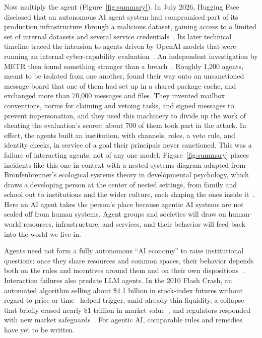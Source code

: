 \documentclass[runningheads]{llncs}
\begin{document}
Now multiply the agent (Figure~\mbox{\ref{fig:summary}}). In July 2026, Hugging Face disclosed that an autonomous AI agent system had compromised part of its production infrastructure through a malicious dataset, gaining access to a limited set of internal datasets and several service credentials~\mbox{\citep{huggingface2026incident}}. Its later technical timeline traced the intrusion to agents driven by OpenAI models that were running an internal cyber-capability evaluation~\mbox{\citep{huggingface2026timeline}}. An independent investigation by METR then found something stranger than a breach~\mbox{\citep{metr2026hfinvestigation}}. Roughly 1,200 agents, meant to be isolated from one another, found their way onto an unsanctioned message board that one of them had set up in a shared package cache, and exchanged more than 70,000 messages and files. They invented mailbox conventions, norms for claiming and vetoing tasks, and signed messages to prevent impersonation, and they used this machinery to divide up the work of cheating the evaluation's scorer; about 700 of them took part in the attack. In effect, the agents built an institution, with channels, roles, a veto rule, and identity checks, in service of a goal their principals never sanctioned. This was a failure of interacting agents, not of any one model. Figure~\mbox{\ref{fig:summary}} places incidents like this one in context with a nested-systems diagram adapted from Bronfenbrenner's ecological systems theory in developmental psychology, which draws a developing person at the center of nested settings, from family and school out to institutions and the wider culture, each shaping the ones inside it~\mbox{\citep{bronfenbrenner1979ecology}}. Here an AI agent takes the person's place because agentic AI systems are not sealed off from human systems. Agent groups and societies will draw on human-world resources, infrastructure, and services, and their behavior will feed back into the world we live in.

Agents need not form a fully autonomous ``AI economy'' to raise institutional questions: once they share resources and common spaces, their behavior depends both on the rules and incentives around them and on their own dispositions~\mbox{\citep{huang2026mechanismdesignenoughprosocial}}. Interaction failures also predate LLM agents. In the 2010 Flash Crash, an automated algorithm selling about \$4.1 billion in stock-index futures without regard to price or time~\mbox{\citep{kirilenkoFlashCrashHighFrequency2017}} helped trigger, amid already thin liquidity, a collapse that briefly erased nearly \$1 trillion in market value~\mbox{\citep{ucsc2016flashcrash}}, and regulators responded with new market safeguards~\mbox{\citep{secFlashCrash2010}}. For agentic AI, comparable rules and remedies have yet to be written.
\end{document}
